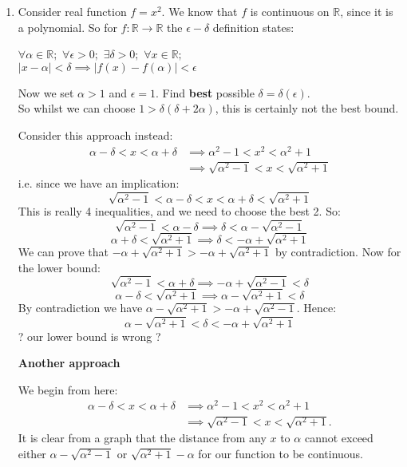 \pagestyle{fancy}
\fancyhead{}

\begin{enumerate}
    \item Consider real function $f=x^2$. We know that $f$ is continuous on $\mathbb{R}$, since it is a polynomial.
    So for $f:\mathbb{R}\rightarrow\mathbb{R}$ the $\epsilon-\delta$ definition states:

    $\forall \alpha \in \mathbb{R};$ $\forall\epsilon>0;$ $\exists\delta>0;$
    $\forall x \in \mathbb{R};$ \\
    $|x-\alpha|<\delta \implies |f(x)-f(\alpha)|<\epsilon$

    Now we set $\alpha>1$ and $\epsilon=1$. Find \textbf{best} possible $\delta = \delta (\epsilon)$. \\

    So whilst we can choose $1>\delta(\delta+2\alpha)$, this is certainly not the best bound.

    Consider this approach instead:
    \begin{align*}
        \alpha-\delta<x<\alpha+\delta &\implies \alpha^2-1<x^2<\alpha^2+1 \\
        &\implies \sqrt{\alpha^2-1}<x<\sqrt{\alpha^2+1}
    \end{align*}
    i.e. since we have an implication:
    $$\sqrt{\alpha^2-1}<\alpha-\delta<x<\alpha+\delta<\sqrt{\alpha^2+1}$$
    This is really 4 inequalities, and we need to choose the best 2. So:
    $$\sqrt{\alpha^2-1}<\alpha-\delta\implies\delta<\alpha-\sqrt{\alpha^2-1}$$
    $$\alpha+\delta<\sqrt{\alpha^2+1}\implies\delta<-\alpha+\sqrt{\alpha^2+1}$$
    We can prove that $-\alpha+\sqrt{\alpha^2+1}>-\alpha+\sqrt{\alpha^2+1}$
    by contradiction. Now for the lower bound:
    $$\sqrt{\alpha^2-1}<\alpha+\delta\implies-\alpha+\sqrt{\alpha^2-1}<\delta$$
    $$\alpha-\delta<\sqrt{\alpha^2+1}\implies\alpha-\sqrt{\alpha^2+1}<\delta$$
    By contradiction we have $\alpha-\sqrt{\alpha^2+1}>-\alpha+\sqrt{\alpha^2-1}$. Hence:
    $$\alpha-\sqrt{\alpha^2+1}<\delta<-\alpha+\sqrt{\alpha^2+1}$$
    ? our lower bound is wrong ?

    \newpage

    \textbf{Another approach}
    
    We begin from here:
    \begin{align*}
        \alpha-\delta<x<\alpha+\delta &\implies \alpha^2-1<x^2<\alpha^2+1 \\
        &\implies \sqrt{\alpha^2-1}<x<\sqrt{\alpha^2+1}.
    \end{align*}
    It is clear from a graph that the distance from any $x$ to $\alpha$ cannot exceed either $\alpha-\sqrt{\alpha^2-1}$ or $\sqrt{\alpha^2+1}-\alpha$ for our function to be continuous.
    \newpage


\end{enumerate}
